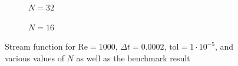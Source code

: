 \begin{figure}[p]
    \vspace{0.5cm}
    
    \begin{subfigure}[b]{0.49\textwidth}
	    \caption{$N = 32$}
    	\label{fig:sfe}
    \end{subfigure}
    \begin{subfigure}[b]{0.49\textwidth}
	    \caption{$N = 16$}
    	\label{fig:sff}
    \end{subfigure}
    \caption{Stream function for $\text{Re} = 1000$, $\Delta t = 0.0002$, $\text{tol} = 1 \cdot 10^{-5}$, and various values of $N$ as well as the benchmark result}
    \label{fig:allsf}
\end{figure}

